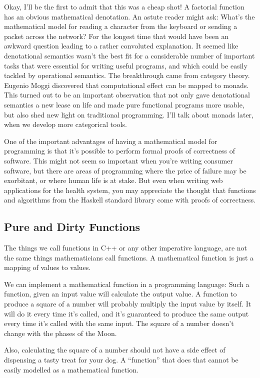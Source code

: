 Okay, I'll be the first to admit that this was a cheap shot! A factorial
function has an obvious mathematical denotation. An astute reader might
ask: What's the mathematical model for reading a character from the
keyboard or sending a packet across the network? For the longest time
that would have been an awkward question leading to a rather convoluted
explanation. It seemed like denotational semantics wasn't the best fit
for a considerable number of important tasks that were essential for
writing useful programs, and which could be easily tackled by
operational semantics. The breakthrough came from category theory.
Eugenio Moggi discovered that computational effect can be mapped to
monads. This turned out to be an important observation that not only
gave denotational semantics a new lease on life and made pure functional
programs more usable, but also shed new light on traditional
programming. I'll talk about monads later, when we develop more
categorical tools.

One of the important advantages of having a mathematical model for
programming is that it's possible to perform formal proofs of
correctness of software. This might not seem so important when you're
writing consumer software, but there are areas of programming where the
price of failure may be exorbitant, or where human life is at stake. But
even when writing web applications for the health system, you may
appreciate the thought that functions and algorithms from the Haskell
standard library come with proofs of correctness.

\subsection{Pure and Dirty Functions}\label{pure-and-dirty-functions}

The things we call functions in C++ or any other imperative language,
are not the same things mathematicians call functions. A mathematical
function is just a mapping of values to values.

We can implement a mathematical function in a programming language: Such
a function, given an input value will calculate the output value. A
function to produce a square of a number will probably multiply the
input value by itself. It will do it every time it's called, and it's
guaranteed to produce the same output every time it's called with the
same input. The square of a number doesn't change with the phases of the
Moon.

Also, calculating the square of a number should not have a side effect
of dispensing a tasty treat for your dog. A ``function'' that does that
cannot be easily modelled as a mathematical function.

